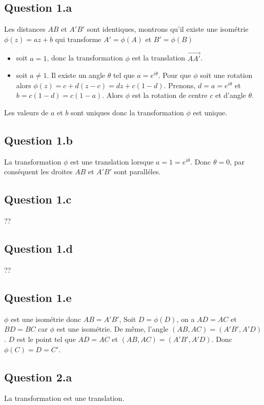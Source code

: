 \documentclass[]{book}
\theoremstyle{definition}
\begin{document}
\subsection*{Question 1.a}
Les distances $AB$ et $A'B'$ sont identiques, montrons qu'il existe une isom\'etrie $\phi(z) =  az+ b$ qui transforme $A' = \phi(A)$ et $B' = \phi(B)$ 
\begin{itemize}
\item soit $a=1$, donc la transformation $\phi$ est la translation $\overrightarrow{AA'}$.
\item soit $a \neq 1$. Il existe un angle $\theta$ tel que $a=e^{i\theta}$. Pour que $\phi$ soit une rotation alors $\phi(z) =  c + d(z - c) = dz +c(1-d)$. Prenons, $d = a = e^{i\theta}$ et $b=c(1-d)=c(1-a)$. Alors $\phi$ est la rotation de centre $c$ et d'angle $\theta$. 
\end{itemize}

Les valeurs de $a$ et $b$ sont uniques donc la transformation $\phi$ est unique.

\subsection*{Question 1.b}
La transformation $\phi$ est une translation lorsque $a=1=e^{i\theta}$. Donc $\theta = 0$, par cons\'equent les droites $AB$ et $A'B'$ sont parall\'eles. 

\subsection*{Question 1.c}
??


\subsection*{Question 1.d}
??

\subsection*{Question 1.e}
$\phi$ est une isom\'etrie donc $AB = A'B'$, Soit $D = \phi(D)$, on a $AD = AC$ et $BD = BC$ car $\phi$ est une isom\'etrie.
De m\^eme, l'angle $(AB, AC) = (A'B', A'D)$. $D$ est le point tel que $AD=AC$ et  $(AB, AC) = (A'B', A'D)$. Donc $\phi(C)=D=C'$.

\subsection*{Question 2.a}
La transformation est une translation.
\end{document}
